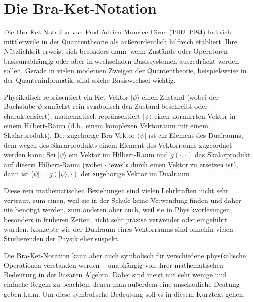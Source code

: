 
\chapter{Die Bra-Ket-Notation}
\label{chap_BraKet}

%
Die Bra-Ket-Notation von Paul Adrien Maurice Dirac (1902--1984) \cite{Dirac} hat 
sich mittlerweile in der Quantentheorie
als au\ss erordentlich hilfreich etabliert. Ihre N\"utzlichkeit erweist sich besonders dann,
wenn Zust\"ande oder Operatoren basisunabh\"angig oder aber in wechselnden Basissystemen ausgedr\"uckt
werden sollen. Gerade in vielen modernen Zweigen der Quantentheorie, beispielsweise in der
Quanteninformatik, sind solche Basiswechsel wichtig. 

Physikalisch repr\"asentiert ein Ket-Vektor $| \psi \rangle$ einen Zustand
(wobei der Buchstabe $\psi$ zun\"achst rein symbolisch den Zustand beschreibt oder charakterisiert),
mathematisch repr\"ansentiert $|\psi \rangle$ einen normierten
Vektor in einem Hilbert-Raum (d.h.\ einem komplexen Vektorraum mit einem Skalarprodukt). 
Der zugeh\"orige Bra-Vektor $\langle \psi |$ ist ein Element des Dualraums, dem
wegen des Skalarprodukts einem Element des Vektorraums zugeordnet werden kann:
Sei $|\psi \rangle$ ein Vektor im Hilbert-Raum und $g(\cdot, \cdot)$ das Skalarprodukt auf
diesem Hilbert-Raum (wobei $\cdot$ jeweils durch einen Vektor zu ersetzen ist), dann ist
$\langle \psi| = g(| \psi \rangle, \cdot)$ der zugeh\"orige Vektor im Dualraum.

Diese rein mathematischen Beziehungen sind vielen Lehrkr\"aften nicht sehr vertraut, zum
einen, weil sie in der Schule keine Verwendung finden und daher nie ben\"otigt werden,
zum anderen aber auch, weil sie in Physikvorlesungen, besonders in fr\"uheren Zeiten,
nicht sehr pr\"azise verwendet oder eingef\"uhrt wurden. Konzepte wie der Dualraum eines
Vektorraums sind ohnehin vielen Studierenden der Physik eher \glqq suspekt\grqq. 

Die Bra-Ket-Notation kann aber auch symbolisch f\"ur verschiedene physikalische Operationen
verstanden werden -- unabh\"angig von ihrer mathematischen Bedeutung in der linearen
Algebra. Dabei sind meist nur sehr wenige und einfache Regeln zu beachten, denen man au\ss erdem
eine anschauliche Deutung geben kann. Um diese symbolische Bedeutung soll es in diesem 
Kurztext gehen. 

